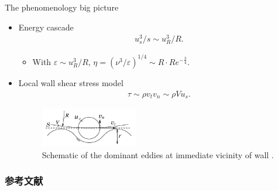 \documentclass[10pt,xcolor={table,dvipsnames},t]{beamer}
\begin{document}
\begin{frame}{The phenomenology big picture}
    \begin{itemize}
        \item Energy cascade
            \begin{align*}
                u_s^3 / s \sim u_R^3 / R
            .\end{align*}
            \begin{itemize}
                \item With $\varepsilon \sim u_R^3 / R$, $\eta = \left( \nu^3 / \varepsilon \right)^{1 / 4}\sim R\cdot Re^{-\frac{3}{4}} $.
            \end{itemize}
        \item Local wall shear stress model
        \begin{align*}
            \tau \sim \rho v_t v_n \sim \rho V u_s
        .\end{align*}
        \begin{figure}[htpb]
            \centering
            \includegraphics[width=0.4\textwidth]{./figures/eddies.png}
            \caption{Schematic of the dominant eddies at immediate vicinity of wall \cite{gioiaprl2001}.}
            \label{fig:-figures-eddies-png}
        \end{figure}
    \end{itemize}
\end{frame}

\begin{frame}[allowframebreaks]
  \frametitle{参考文献}
  \printbibliography[heading=bibliography,title=参考文献]
\end{frame}
\end{document}
